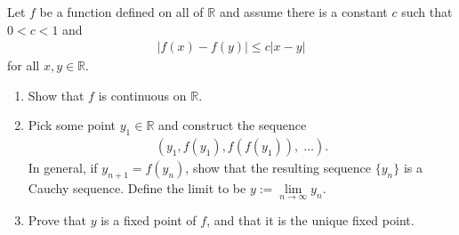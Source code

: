 \documentclass{ximera}
\begin{document}
\begin{exercise}
    Let $f$ be a function defined on all of $\mathbb{R}$ and assume there is a constant $c$ such that $0 < c<1$ and 
    \begin{align*}
        |f(x) - f(y) | \leq c |x-y|
    \end{align*}
    for all $x,y \in \mathbb{R}$.
    \begin{enumerate}
        \item Show that $f$ is continuous on $\mathbb{R}$.
        \vfill
        \item Pick some point $y_1 \in \mathbb{R}$ and construct the sequence 
        \begin{align*}
            (y_1, f(y_1), f(f(y_1)), \;\ldots).
        \end{align*}
        In general, if $y_{n+1}= f(y_n)$, show that the resulting sequence $\{y_n\}$ is a  Cauchy sequence.  Define the limit to be $y := \lim\limits_{n\to \infty} y_n$.
        \vfill
        \newpage
        \item Prove that $y$ is a fixed point of $f$, and that it is the unique fixed point.
    \end{enumerate}
\end{exercise}
 
\end{document}
